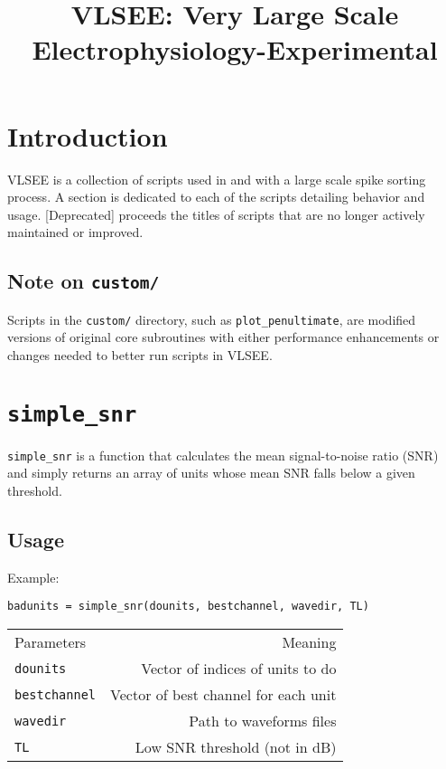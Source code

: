\documentclass{article}
\title{VLSEE: Very Large Scale Electrophysiology-Experimental}
\author{}
\date{}
\begin{document}
\maketitle

\tableofcontents

\section{Introduction}
VLSEE is a collection of scripts used in and with a large scale spike sorting
process. A section is dedicated to each of the scripts detailing behavior
and usage. [Deprecated] proceeds the titles of scripts that are no longer
actively maintained or improved.

\subsection{Note on \texttt{custom/}}
Scripts in the \texttt{custom/} directory, such as
\texttt{plot\_penultimate}, are modified versions of original core
subroutines with either performance enhancements or changes needed to
better run scripts in VLSEE.

\section{\texttt{simple\_snr}}
\texttt{simple\_snr} is a function that calculates the mean signal-to-noise
ratio (SNR) and simply returns an array of units whose mean SNR falls below
a given threshold.

\subsection{Usage}
Example:

\texttt{badunits = simple\_snr(dounits, bestchannel, wavedir, TL)}
\begin{center}
\begin{tabular}{l r}
Parameters&Meaning\\
\texttt{dounits}&Vector of indices of units to do\\
\texttt{bestchannel}&Vector of best channel for each unit\\
\texttt{wavedir}&Path to waveforms files\\
\texttt{TL}&Low SNR threshold (not in dB)

\end{tabular}
\end{center}
\end{document}
